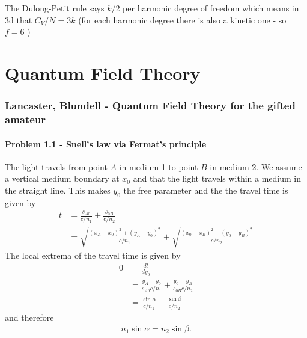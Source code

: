 \documentclass[10pt,a4paper]{book}
\theoremstyle{definition}
\begin{document}
The Dulong-Petit rule says $k/2$ per harmonic degree of freedom which means in 3d that $C_V/N=3k$ (for each harmonic degree there is also a kinetic one - so $f=6$ )
\begin{center}
\end{center}

\chapter{Quantum Field Theory}
\subsection{{\sc Lancaster, Blundell} - Quantum Field Theory for the gifted amateur}
\subsubsection{Problem 1.1 - Snell's law via Fermat's principle}
The light travels from point $A$ in medium 1 to point $B$ in medium 2. We assume a vertical medium boundary at $x_0$ and that the light travels within a medium in the straight line. This makes $y_0$ the free parameter and the the travel time is given by
\begin{align}
    t&=\frac{s_{A0}}{c/n_1}+\frac{s_{0B}}{c/n_2}\\
    &=\sqrt{\frac{(x_A-x_0)^2+(y_A-y_0)^2}{c/n_1}}+\sqrt{\frac{(x_0-x_B)^2+(y_0-y_B)^2}{c/n_2}}
\end{align}
The local extrema of the travel time is given by
\begin{align}
    0&=\frac{dt}{dy_0}\\
    &=\frac{y_A-y_0}{s_{A0}c/n_1}+\frac{y_0-y_B}{s_{0B}c/n_2}\\
    &=\frac{\sin\alpha}{c/n_1}-\frac{\sin\beta}{c/n_2}
\end{align}
and therefore
\begin{align}
n_1\sin\alpha=n_2\sin\beta.
\end{align}
\end{document}
